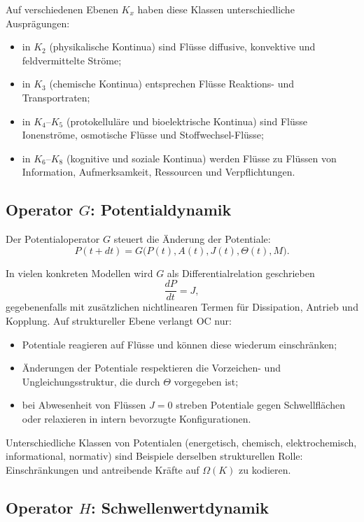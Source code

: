 Auf verschiedenen Ebenen \(K_x\) haben diese Klassen unterschiedliche
Ausprägungen:
\begin{itemize}
  \item in \(K_2\) (physikalische Kontinua) sind Flüsse diffusive, konvektive
        und feldvermittelte Ströme;
  \item in \(K_3\) (chemische Kontinua) entsprechen Flüsse Reaktions- und
        Transportraten;
  \item in \(K_4\)–\(K_5\) (protokelluläre und bioelektrische Kontinua) sind
        Flüsse Ionenströme, osmotische Flüsse und Stoffwechsel-Flüsse;
  \item in \(K_6\)–\(K_8\) (kognitive und soziale Kontinua) werden Flüsse zu
        Flüssen von Information, Aufmerksamkeit, Ressourcen und Verpflichtungen.
\end{itemize}

\subsection{Operator \texorpdfstring{\texorpdfstring{$G$}{G}}{G}: Potentialdynamik}

Der Potentialoperator \(G\) steuert die Änderung der Potentiale:
\[
  P(t+dt) = G\big(P(t), A(t), J(t), \Theta(t), M\big).
\]

In vielen konkreten Modellen wird \(G\) als Differentialrelation geschrieben
\[
  \frac{dP}{dt} = J,
\]
gegebenenfalls mit zusätzlichen nichtlinearen Termen für Dissipation,
Antrieb und Kopplung.
Auf struktureller Ebene verlangt OC nur:
\begin{itemize}
  \item Potentiale reagieren auf Flüsse und können diese wiederum einschränken;
  \item Änderungen der Potentiale respektieren die Vorzeichen- und
        Ungleichungsstruktur, die durch \(\Theta\) vorgegeben ist;
  \item bei Abwesenheit von Flüssen \(J = 0\) streben Potentiale gegen
        Schwellflächen oder relaxieren in intern bevorzugte Konfigurationen.
\end{itemize}

Unterschiedliche Klassen von Potentialen (energetisch, chemisch, elektrochemisch,
informational, normativ) sind Beispiele derselben strukturellen Rolle:
Einschränkungen und antreibende Kräfte auf \(\Omega(K)\) zu kodieren.

\subsection{Operator \texorpdfstring{\texorpdfstring{$H$}{H}}{H}: Schwellenwertdynamik}

